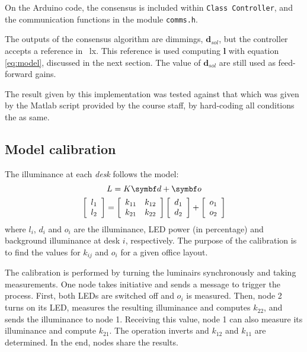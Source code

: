 \documentclass[english,fira]{ist-report}
\begin{document}
On the Arduino code, the consensus is included within \texttt{Class Controller}, and the communication functions in the module \texttt{comms.h}.

The outputs of the consensus algorithm are dimmings, $\textbf{d}_{sol}$, but the controller accepts a reference in \SI{}{\lux}. This reference is used computing $\textbf{l}$ with equation \ref{eq:model}, discussed in the next section.
The value of $\textbf{d}_{sol}$ are still used as feed-forward gains.

The result given by this implementation was tested against that which was given by the Matlab script provided by the course staff, by hard-coding all conditions the as same.  

\subsection{Model calibration} \label{sec:calibration}

The illuminance at each \textit{desk} follows the model:
\begin{gather}
  L = K \matr{d} + \matr{o} \nonumber \\ 
  \left[\begin{array}{c} l_{1}\\ l_{2} \end{array}\right] =
  \left[\begin{array}{cc}
	k_{11} & k_{12}\\
	k_{21} & k_{22}
  \end{array}\right]
  \left[\begin{array}{c} d_{1}\\ d_{2}\end{array}\right]+
  \left[\begin{array}{c} o_{1}\\ o_{2} \end{array}\right]
  \label{eq:model}
\end{gather}
where $l_i$, $d_i$ and $o_i$ are the illuminance, LED power (in percentage) and background illuminance at desk $i$, respectively. The purpose of the calibration is to find the values for $k_{ij}$ and $o_i$ for a given office layout.

The calibration is performed by turning the luminairs synchronously and taking measurements. One node takes initiative and sends a message to trigger the process. First, both LEDs are switched off and $o_i$ is measured.
Then, node 2 turns on its LED, measures the resulting illuminance and computes $k_{22}$, and sends the illuminance to node 1. Receiving this value, node 1 can also measure its illuminance and compute $k_{21}$. The operation inverts and $k_{12}$ and $k_{11}$ are determined. In the end, nodes share the results.
\end{document}
